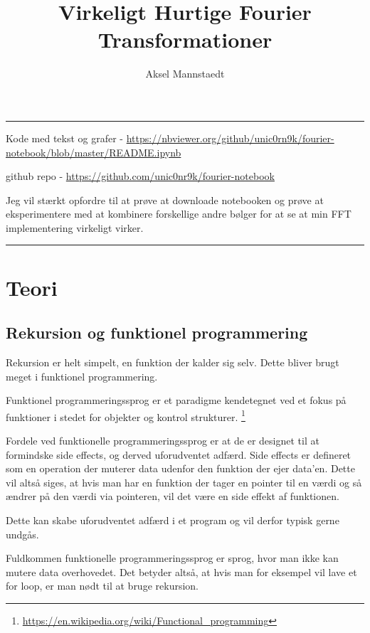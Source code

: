 \documentclass[11pt,a4paper]{article}
\author{Aksel Mannstaedt}
\date{}
\title{Virkeligt Hurtige Fourier Transformationer}
\begin{document}
\maketitle
\noindent\rule{\textwidth}{0.5pt}
Kode med tekst og grafer - \url{https://nbviewer.org/github/unic0rn9k/fourier-notebook/blob/master/README.ipynb}

github repo - \url{https://github.com/unic0nr9k/fourier-notebook}

\bigskip

Jeg vil stærkt opfordre til at prøve at downloade notebooken og prøve at eksperimentere med at kombinere forskellige andre bølger for at se at min FFT implementering virkeligt virker.

\noindent\rule{\textwidth}{0.5pt}

\setcounter{tocdepth}{2}
\tableofcontents

\newpage

\section{Teori}
\label{sec:org9cdcee4}
\subsection{Rekursion og funktionel programmering}
\label{sec:orgb989928}

Rekursion er helt simpelt, en funktion der kalder sig selv.
Dette bliver brugt meget i funktionel programmering.

Funktionel programmeringssprog er et paradigme kendetegnet ved
et fokus på funktioner i stedet for objekter og kontrol strukturer. \footnote{\url{https://en.wikipedia.org/wiki/Functional\_programming}}

\bigskip

Fordele ved funktionelle programmeringssprog er at de er designet til at formindske side effects,
og derved uforudventet adfærd.
Side effects er defineret som en operation der muterer data udenfor den funktion der ejer data'en.
Dette vil altså siges, at hvis man har en funktion der tager en pointer til en værdi og så ændrer på
den værdi via pointeren, vil det være en side effekt af funktionen.

Dette kan skabe uforudventet adfærd i et program og vil derfor typisk gerne undgås.

Fuldkommen funktionelle programmeringssprog er sprog, hvor man ikke kan mutere data overhovedet.
Det betyder altså, at hvis man for eksempel vil lave et for loop, er man nødt til at bruge rekursion.
\end{document}
